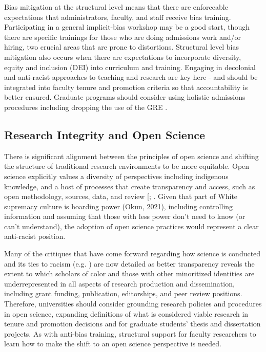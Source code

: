 \documentclass[
  11pt,
]{book}
\begin{document}
Bias mitigation at the structural level means that there are enforceable expectations that administrators, faculty, and staff receive bias training. Participating in a general implicit-bias workshop may be a good start, though there are specific trainings for those who are doing admissions work and/or hiring, two crucial areas that are prone to distortions. Structural level bias mitigation also occurs when there are expectations to incorporate diversity, equity and inclusion (DEI) into curriculum and training. Engaging in decolonial and anti-racist approaches to teaching and research are key here - and should be integrated into faculty tenure and promotion criteria so that accountability is better ensured. Graduate programs should consider using holistic admissions procedures including dropping the use of the GRE \citep{feldon_predictive_2024}.

\subsection{Research Integrity and Open Science}\label{research-integrity-and-open-science}

There is significant alignment between the principles of open science and shifting the structure of traditional research environments to be more equitable. Open science explicitly values a diversity of perspectives including indigenous knowledge, and a host of processes that create transparency and access, such as open methodology, sources, data, and review {[}\citet{noauthor_open_2018}; \citet{unesco_unesco_2021}. Given that part of White supremacy culture is hoarding power (Okun, 2021), including controlling information and assuming that those with less power don't need to know (or can't understand), the adoption of open science practices would represent a clear anti-racist position.

Many of the critiques that have come forward regarding how science is conducted and its ties to racism (e.g. \citet{buchanan_upending_2021}) are now detailed as better transparency reveals the extent to which scholars of color and those with other minoritized identities are underrepresented in all aspects of research production and dissemination, including grant funding, publication, editorships, and peer review positions. Therefore, universities should consider grounding research policies and procedures in open science, expanding definitions of what is considered viable research in tenure and promotion decisions and for graduate students' thesis and dissertation projects. As with anti-bias training, structural support for faculty researchers to learn how to make the shift to an open science perspective is needed.
\end{document}
